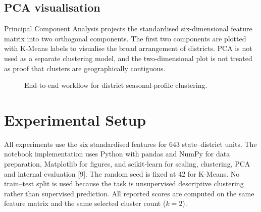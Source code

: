 \documentclass[9pt,a4paper,twocolumn]{extarticle}
\begin{document}
\subsection{PCA visualisation}
Principal Component Analysis projects the standardised six-dimensional feature matrix into two orthogonal components. The first two components are plotted with K-Means labels to visualise the broad arrangement of districts. PCA is not used as a separate clustering model, and the two-dimensional plot is not treated as proof that clusters are geographically contiguous.

\begin{figure}[H]
\centering
{}
\caption{End-to-end workflow for district seasonal-profile clustering.}
\label{fig:workflow}
\end{figure}

\section{Experimental Setup}
All experiments use the six standardised features for 643 state--district units. The notebook implementation uses Python with pandas and NumPy for data preparation, Matplotlib for figures, and scikit-learn for scaling, clustering, PCA and internal evaluation [9]. The random seed is fixed at 42 for K-Means. No train--test split is used because the task is unsupervised descriptive clustering rather than supervised prediction. All reported scores are computed on the same feature matrix and the same selected cluster count ($k=2$).
\end{document}

